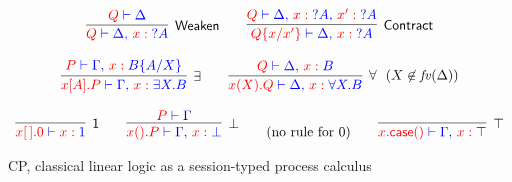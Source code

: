 \begin{figure*}
\[\begin{array}{c}
\inference{
  \tm{Q} \tpvdash \tp{\Delta}
}{Weaken}{
  \tm{Q} \tpvdash \tp{\Delta \comma \tmof{x}{?A}}
}

\quad\quad

\inference{
  \tm{Q} \tpvdash \tp{\Delta \comma \tmof{x}{?A} \comma \tmof{x'}{?A}}
}{Contract}{
  \tm{Q\sub{x/x'}} \tpvdash \tp{\Delta \comma \tmof{x}{?A}}
}

\\~\\

\inference{
  \tm{P} \tpvdash \tp{\Gamma \comma \tmof{x}B\sub{A/X}}
}{\exists}{
  \tm{x[A].P} \tpvdash \tp{\Gamma \comma \tmof{x}\any{X}B}
}

\quad\quad

\inference{
  \tm{Q} \tpvdash \tp{\Delta \comma \tmof{x}B}
}{\forall~~\textrm{($X \not\in \fv(\Delta)$)}}{
  \tm{x(X).Q} \tpvdash \tp{\Delta \comma \tmof{x}\all{X}B}
}

\\~\\

\inference{}{1}{
  \tm{x[\,].0} \tpvdash \tp{\tmof{x}1}
}

\quad\quad

\inference{
  \tm{P} \tpvdash \tp{\Gamma}
}{\bot}{
  \tm{x().P} \tpvdash \tp{\Gamma \comma \tmof{x}\bot}
}

\quad\quad

\textrm{(no rule for $0$)}

\quad\quad

\inference{}{\top}{
  \tm{x.\caseterm()} \tpvdash \tp{\Gamma \comma \tmof{x}\top}
}

\end{array}
\]
\caption{CP, classical linear logic as a session-typed process calculus}
\label{fig:cll}
\end{figure*}
